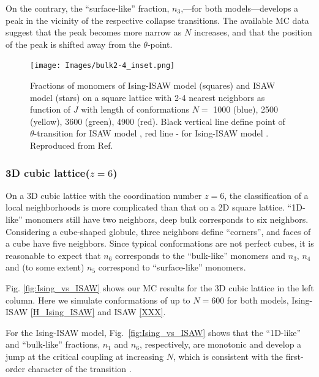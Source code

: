 \documentclass[a4paper]{jpconf}
\begin{document}
On the contrary, the ``surface-like'' fraction, $n_3$,---for both models---develops
a peak in the vicinity of the respective collapse transitions. The available MC
data suggest that the peak becomes more narrow as $N$ increases, and that the
position of the peak is shifted away from the $\theta$-point.


\begin{figure}
    \centering
    \texttt{[image: Images/bulk2-4\_inset.png]}
    \caption{Fractions of monomers of Ising-ISAW model (squares) and ISAW model (stars) on a square lattice with 2-4 nearest neighbors as function of $J$ with length of conformations $N = $ 1000 (blue), 2500 (yellow), 3600 (green), 4900 (red). Black vertical line define point of $\theta$-transition for ISAW model \cite{Caracciolo2011}, red line - for Ising-ISAW model \cite{faizullina2021critical, Foster2021}. Reproduced from Ref.\cite{faizullina2021critical}}
    \label{fig:Ising_vs_ISAW2D}
\end{figure}



\subsubsection{3D cubic lattice($z=6$) }

On a 3D cubic lattice with the coordination number $z=6$, the classification of a
local neighborhoods is more complicated than that on a 2D square lattice.
``1D-like'' monomers still have two neighbors, deep bulk corresponds to six
neighbors. Considering a cube-shaped globule, three neighbors define ``corners'',
and faces of a cube have five neighbors.
Since typical conformations are not perfect cubes, it is reasonable to expect
that $n_6$ corresponds to the ``bulk-like'' monomers and
$n_3$, $n_4$ and (to some extent) $n_5$ correspond to ``surface-like'' monomers.

Fig. \ref{fig:Ising_vs_ISAW} shows our MC results for the 3D cubic lattice in the
left column. Here we simulate conformations of up to $N=600$ for both models,
Ising-ISAW \ref{H_Ising_ISAW} and ISAW \ref{XXX}.

For the Ising-ISAW model, Fig.\ \ref{fig:Ising_vs_ISAW} shows that the
``1D-like'' and ``bulk-like'' fractions, $n_1$ and $n_6$, respectively,
are monotonic and develop a jump at the critical coupling at increasing $N$, which is
consistent with the first-order character of the transition \cite{Garel1999, Foster2021}.
\end{document}
